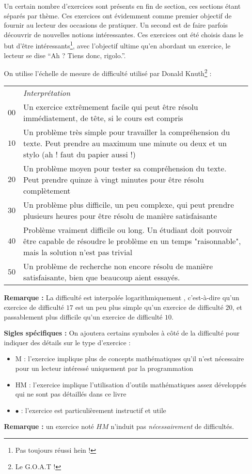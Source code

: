 \documentclass[../main.tex]{subfiles}
\begin{document}
Un certain nombre d'exercices sont présents en fin de section, ces sections étant séparés par thème. Ces exercices ont évidemment comme premier objectif de fournir au lecteur des occasions de pratiquer. Un second est de faire parfois découvrir de nouvelles notions intéressantes. Ces exercices ont été choisis dans le but d'être intéressants\footnote{Pas toujours réussi hein !}, avec l'objectif ultime qu'en abordant un exercice, le lecteur se dise ``Ah ? Tiens donc, rigolo.''.

On utilise l'échelle de mesure de difficulté utilisé par Donald Knuth\footnote{Le G.O.A.T !}\cite{TAOCP} : 
\begin{center}
	\begin{tabular}{cp{}}
	& \textit{Interprétation} \\
	$00$ & Un exercice extrêmement facile qui peut être résolu immédiatement, de tête, si le cours est compris \\
	$10$ & Un problème très simple pour travailler la compréhension du texte. Peut prendre au maximum une minute ou deux et un stylo (ah ! faut du papier aussi !)\\
	$20$ & Un problème moyen pour tester sa compréhension du texte. Peut prendre quinze à vingt minutes pour être résolu complètement \\
	$30$ & Un problème plus difficile, un peu complexe, qui peut prendre plusieurs heures pour être résolu de manière satisfaisante \\
	$40$ & Problème vraiment difficile ou long. Un étudiant doit pouvoir être capable de résoudre le problème en un temps "raisonnable", mais la solution n'est pas trivial \\
	$50$ & Un problème de recherche non encore résolu de manière satisfaisante, bien que beaucoup aient essayés.
	\end{tabular}
\end{center}
\textbf{Remarque : } La difficulté est interpolée \og logarithmiquement \fg, c'est-à-dire qu'un exercice de difficulté $17$ est un peu plus simple qu'un exercice de difficulté $20$, et passablement plus difficile qu'un exercice de difficulté $10$.

\textbf{Sigles spécifiques :} On ajoutera certains symboles à côté de la difficulté pour indiquer des détails sur le type d'exercice :
\begin{itemize}
	\item M : l'exercice implique plus de concepts mathématiques qu'il n'est nécessaire pour un lecteur intéressé uniquement par la programmation
	\item HM : l'exercice implique l'utilisation d'outils mathématiques assez développés qui ne sont pas détaillés dans ce livre
	\item $\bullet$ : l'exercice est particulièrement instructif et utile
\end{itemize}
\textbf{Remarque :} un exercice noté $HM$ n'induit pas \textit{nécessairement} de difficultés.
\end{document}
